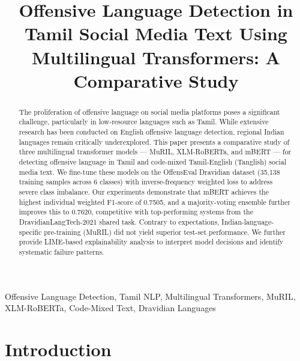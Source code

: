 \documentclass[conference]{IEEEtran}
\begin{document}
\title{Offensive Language Detection in Tamil Social Media Text Using Multilingual Transformers: A Comparative Study}

\author{
}

\maketitle

\begin{abstract}
The proliferation of offensive language on social media platforms poses a significant challenge, particularly in low-resource languages such as Tamil. While extensive research has been conducted on English offensive language detection, regional Indian languages remain critically underexplored. This paper presents a comparative study of three multilingual transformer models --- MuRIL, XLM-RoBERTa, and mBERT --- for detecting offensive language in Tamil and code-mixed Tamil-English (Tanglish) social media text. We fine-tune these models on the OffensEval Dravidian dataset (35,138 training samples across 6 classes) with inverse-frequency weighted loss to address severe class imbalance. Our experiments demonstrate that mBERT achieves the highest individual weighted F1-score of 0.7505, and a majority-voting ensemble further improves this to 0.7620, competitive with top-performing systems from the DravidianLangTech-2021 shared task. Contrary to expectations, Indian-language-specific pre-training (MuRIL) did not yield superior test-set performance. We further provide LIME-based explainability analysis to interpret model decisions and identify systematic failure patterns.
\end{abstract}

\begin{IEEEkeywords}
Offensive Language Detection, Tamil NLP, Multilingual Transformers, MuRIL, XLM-RoBERTa, Code-Mixed Text, Dravidian Languages
\end{IEEEkeywords}

\section{Introduction}
\end{document}

